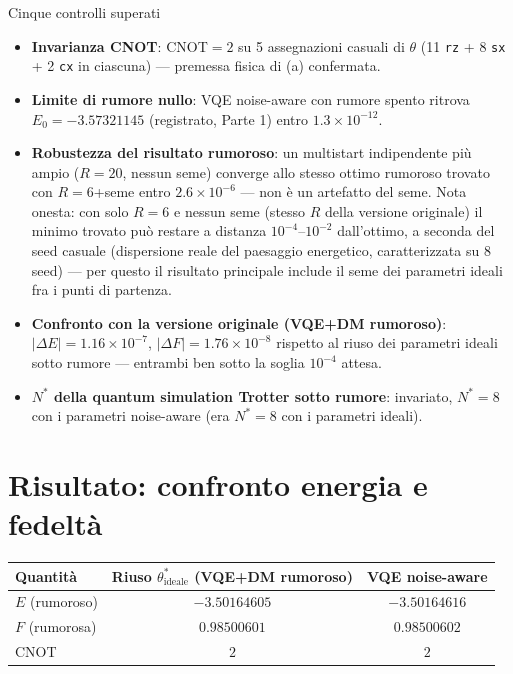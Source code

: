\documentclass[11pt,a4paper]{article}
\begin{document}
\begin{okbox}{Cinque controlli superati}
\begin{itemize}[leftmargin=1.2em,itemsep=0.2em]
\item \textbf{Invarianza CNOT}: CNOT$=2$ su 5 assegnazioni casuali di
$\theta$ (11 \texttt{rz} + 8 \texttt{sx} + 2 \texttt{cx} in ciascuna) ---
premessa fisica di (a) confermata.
\item \textbf{Limite di rumore nullo}: VQE noise-aware con rumore spento
ritrova $E_0=-3.57321145$ (registrato, Parte 1) entro $1.3\times10^{-12}$.
\item \textbf{Robustezza del risultato rumoroso}: un multistart
indipendente più ampio ($R=20$, nessun seme) converge allo stesso ottimo
rumoroso trovato con $R=6$+seme entro $2.6\times10^{-6}$ --- non è un
artefatto del seme. Nota onesta: con solo $R=6$ e nessun seme (stesso $R$
della versione originale) il minimo trovato può restare a distanza
$10^{-4}$--$10^{-2}$ dall'ottimo, a seconda del seed casuale (dispersione
reale del paesaggio energetico, caratterizzata su 8 seed) --- per questo
il risultato principale include il seme dei parametri ideali fra i punti
di partenza.
\item \textbf{Confronto con la versione originale (VQE+DM rumoroso)}:
$|\Delta E|=1.16\times10^{-7}$,
$|\Delta F|=1.76\times10^{-8}$ rispetto al riuso dei parametri ideali sotto
rumore --- entrambi ben sotto la soglia $10^{-4}$ attesa.
\item \textbf{$N^*$ della quantum simulation Trotter sotto rumore}:
invariato, $N^*=8$ con i parametri
noise-aware (era $N^*=8$ con i parametri ideali).
\end{itemize}
\end{okbox}

\section*{Risultato: confronto energia e fedeltà}

\begin{center}
\renewcommand{\arraystretch}{1.25}
\begin{tabular}{@{}lcc@{}}
\toprule
\textbf{Quantità} & \textbf{Riuso $\theta^*_\text{ideale}$ (VQE+DM rumoroso)} & \textbf{VQE noise-aware}\\
\midrule
$E$ (rumoroso) & $-3.50164605$ & $-3.50164616$\\
$F$ (rumorosa) & $0.98500601$ & $0.98500602$\\
CNOT & $2$ & $2$\\
\bottomrule
\end{tabular}
\end{center}
\end{document}
